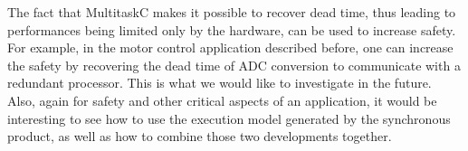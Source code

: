 \documentclass[10pt]{report}
\begin{document}
The fact that MultitaskC makes it possible to recover dead time, thus leading to performances being limited only by the hardware,
can be used to increase safety. For example, in the motor control application described before, one can increase the safety 
by recovering the dead time of ADC conversion to communicate with a redundant processor. This is what we would like to
investigate in the future. Also, again for safety and other critical aspects of an application, it would be interesting 
to see how to use the execution model generated by the synchronous product, as well as how to combine those two developments 
together. 


\scriptsize


\end{document}
